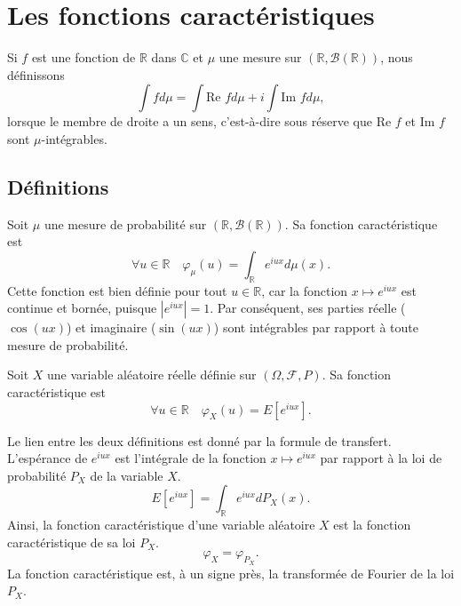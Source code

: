 \chapter{Les fonctions caractéristiques}
\sloppy


Si $f$ est une fonction de $\mathbb{R}$ dans $\mathbb{C}$ et $\mu$ une mesure sur $(\mathbb{R}, \mathcal{B}(\mathbb{R}))$, nous définissons
\[ \int f d\mu = \int \text{Re } f d\mu + i \int \text{Im } f d\mu, \]
lorsque le membre de droite a un sens, c'est-à-dire sous réserve que $\text{Re } f$ et $\text{Im } f$ sont $\mu$-intégrables.
\section{Définitions}
\begin{definition}
Soit $\mu$ une mesure de probabilité sur $(\mathbb{R}, \mathcal{B}(\mathbb{R}))$. Sa fonction caractéristique est
\[ \forall u \in \mathbb{R} \quad \varphi_{\mu}(u) = \int_{\mathbb{R}} e^{iux} d\mu(x). \]
Cette fonction est bien définie pour tout $u \in \mathbb{R}$, car la fonction $x \mapsto e^{iux}$ est continue et bornée, puisque $|e^{iux}| = 1$. Par conséquent, ses parties réelle ($\cos(ux)$) et imaginaire ($\sin(ux)$) sont intégrables par rapport à toute mesure de probabilité.
\end{definition}
\begin{definition}
Soit $X$ une variable aléatoire réelle définie sur $(\Omega, \mathcal{F}, P)$. Sa fonction caractéristique est
\[ \forall u \in \mathbb{R} \quad \varphi_X(u) = E[e^{iux}]. \]
\end{definition}
Le lien entre les deux définitions est donné par la formule de transfert. L'espérance de $e^{iux}$ est l'intégrale de la fonction $x \mapsto e^{iux}$ par rapport à la loi de probabilité $P_X$ de la variable $X$.
\[ E[e^{iux}] = \int_{\mathbb{R}} e^{iux} dP_X(x). \]
Ainsi, la fonction caractéristique d'une variable aléatoire $X$ est la fonction caractéristique de sa loi $P_X$.
\[ \varphi_X = \varphi_{P_X}. \]
La fonction caractéristique est, à un signe près, la transformée de Fourier de la loi $P_X$.
